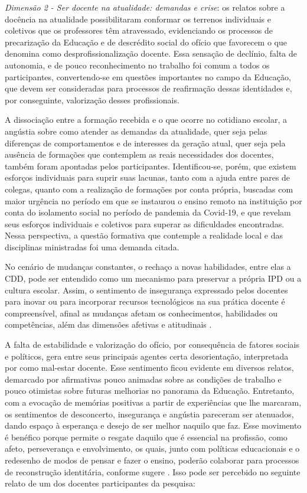 \documentclass[portuguese]{textolivre}
\begin{document}
\textit{Dimensão 2 - Ser docente na atualidade: demandas e crise}: os relatos sobre a docência na atualidade possibilitaram conformar os terrenos individuais e coletivos que os professores têm atravessado, evidenciando os processos de precarização da Educação e de descrédito social do ofício que favorecem o que \textcite{libaneo1998} denomina como desprofissionalização docente. Essa sensação de declínio, falta de autonomia, e de pouco reconhecimento no trabalho foi comum a todos os participantes, convertendo-se em questões importantes no campo da Educação, que devem ser consideradas para processos de reafirmação dessas identidades e, por conseguinte, valorização desses profissionais.

A dissociação entre a formação recebida e o que ocorre no cotidiano escolar, a angústia sobre como atender as demandas da atualidade, quer seja pelas diferenças de comportamentos e de interesses da geração atual, quer seja pela ausência de formações que contemplem as reais necessidades dos docentes, também foram apontadas pelos participantes. Identificou-se, porém, que existem esforços individuais para suprir suas lacunas, tanto com a ajuda entre pares de colegas, quanto com a realização de formações por conta própria, buscadas com maior urgência no período em que se instaurou o ensino remoto na instituição por conta do isolamento social no período de pandemia da Covid-19, e que revelam seus esforços individuais e coletivos para superar as dificuldades encontradas. Nessa perspectiva, a questão formativa que contemple a realidade local e das disciplinas ministradas foi uma demanda citada.

No cenário de mudanças constantes, o rechaço a novas habilidades, entre elas a CDD, pode ser entendido como um mecanismo para preservar a própria IPD ou a cultura escolar. Assim, o sentimento de insegurança expressado pelos docentes para inovar ou para incorporar recursos tecnológicos na sua prática docente é compreensível, afinal as mudanças afetam os conhecimentos, habilidades ou competências, além das dimensões afetivas e atitudinais \cite{bolivar2006}. 

A falta de estabilidade e valorização do ofício, por consequência de fatores sociais e políticos, gera entre seus principais agentes certa desorientação, interpretada por \textcite{esteve1999} como mal-estar docente. Esse sentimento ficou evidente em diversos relatos, demarcado por afirmativas pouco animadas sobre as condições de trabalho e pouco otimistas sobre futuras melhorias no panorama da Educação. Entretanto, com a evocação de memórias positivas a partir de experiências que lhe marcaram, os sentimentos de desconcerto, insegurança e angústia pareceram ser atenuados, dando espaço à esperança e desejo de ser melhor naquilo que faz. Esse movimento é benéfico porque permite o resgate daquilo que é essencial na profissão, como afeto, perseverança e envolvimento, os quais, junto com políticas educacionais e o redesenho de modos de pensar e fazer o ensino, poderão colaborar para processos de reconstrução identitária, conforme sugere \textcite{bolivar2006}. Isso pode ser percebido no seguinte relato de um dos docentes participantes da pesquisa:
\end{document}

